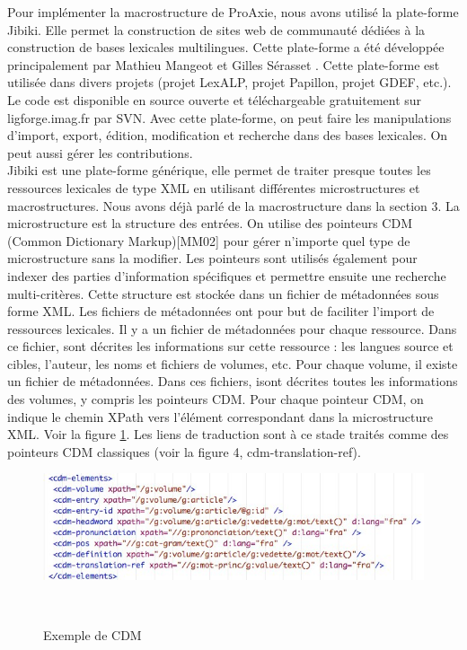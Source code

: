 \documentclass[10pt,a4paper,twoside]{article}
\begin{document}
\cite{MMCE11}
Pour implémenter la macrostructure de ProAxie, nous avons utilisé la plate-forme Jibiki. Elle permet la construction de sites web de communauté dédiées à la construction de bases lexicales multilingues. Cette plate-forme a été développée principalement par Mathieu Mangeot et Gilles Sérasset \cite{MM06}. Cette plate-forme est utilisée dans divers projets (projet LexALP, projet Papillon, projet GDEF, etc.). Le code est disponible en source ouverte et téléchargeable gratuitement sur ligforge.imag.fr par SVN. Avec cette plate-forme, on peut faire les manipulations d'import, export, édition, modification et recherche dans des bases lexicales. On peut aussi gérer les contributions. \\
Jibiki est une plate-forme générique, elle permet de traiter presque toutes les ressources lexicales de type XML en utilisant différentes microstructures et macrostructures. Nous avons déjà parlé de la macrostructure dans la section 3. La microstructure est la structure des entrées. On utilise des pointeurs CDM (Common Dictionary Markup)[MM02] pour gérer n'importe quel type de microstructure sans la modifier. Les pointeurs sont utilisés également pour indexer des parties d'information spécifiques et permettre ensuite une recherche multi-critères. Cette structure est stockée dans un fichier de métadonnées sous forme XML. Les fichiers de métadonnées ont pour but de faciliter l'import de ressources lexicales.  Il y a un fichier de métadonnées pour chaque ressource.  Dans ce fichier, sont décrites les informations sur cette ressource :  les langues source et cibles, l'auteur, les noms et fichiers de volumes, etc. Pour chaque volume, il existe un fichier de métadonnées. Dans ces fichiers, isont décrites toutes les informations des volumes, y compris les pointeurs CDM. Pour chaque pointeur CDM, on indique le chemin XPath vers l'élément correspondant dans la microstructure XML. Voir la figure \ref{image-CDM}. Les liens de traduction sont à ce stade traités comme des pointeurs CDM classiques (voir la figure 4, cdm-translation-ref). \\
\begin{figure}[htbp] 
\begin{center} 
\includegraphics[width=14cm]{images/CDM.jpg}
\end{center} 
\caption{Exemple de CDM} \label{image-CDM} \
\end{figure}
\end{document}
